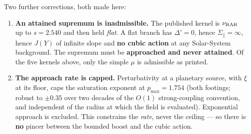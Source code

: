 \documentclass[11pt,letterpaper]{article}
\begin{document}
Two further corrections, both made here:
\begin{enumerate}
\item \textbf{An attained supremum is inadmissible.} The published kernel is $\nu_{\rm RAR}$ up to $s=2.540$ and then held \emph{flat}. A flat branch has $\Delta'=0$, hence $\Sigma_\parallel=\infty$, hence $J(Y)$ of infinite slope and \textbf{no cubic action} at any Solar-System background. The supremum must be \textbf{approached and never attained}. Of the five kernels above, only the simple $\mu$ is admissible as printed.
\item \textbf{The approach rate is capped.} Perturbativity at a planetary source, with $\xi$ at its floor, caps the saturation exponent at \textbf{$p_{\max}=1.754$} (both footings; robust to $\pm0.35$ over two decades of the $O(1)$ strong-coupling convention, and independent of the radius at which the field is evaluated). Exponential approach is excluded. This constrains the \emph{rate}, never the ceiling --- so there is \textbf{no} pincer between the bounded boost and the cubic action.
\end{enumerate}
\end{document}
